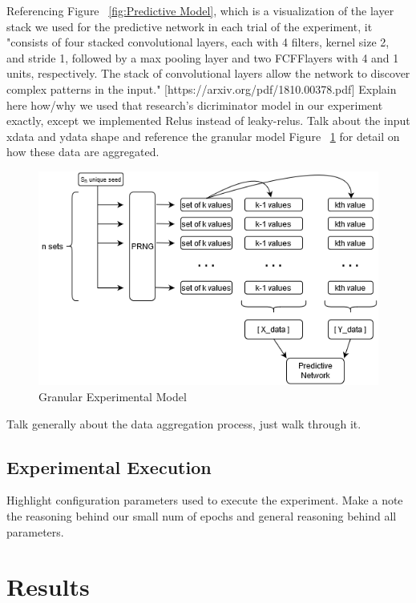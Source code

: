 \documentclass[conference]{IEEEtran}
\begin{document}
Referencing Figure ~\ref{fig:Predictive Model}, which is a visualization of the layer stack we used for the predictive network in each trial of the experiment, it "consists of four stacked convolutional layers, each with 4 filters, kernel size 2, and stride 1, followed by a max pooling layer and two FCFFlayers with 4 and 1 units, respectively. The stack of convolutional layers allow the network to discover complex patterns in the input." [https://arxiv.org/pdf/1810.00378.pdf] Explain here how/why we used that research's dicriminator model in our experiment exactly, except we implemented Relus instead of leaky-relus. Talk about the input xdata and ydata shape and reference the granular model Figure ~\ref{fig:Granular Experimental Model} for detail on how these data are aggregated.



\begin{figure}[H]
\centering
\includegraphics[width=1\linewidth]{./Images/GranularModel.png}
\caption{Granular Experimental Model}
\label{fig:Granular Experimental Model}
\end{figure}

Talk generally about the data aggregation process, just walk through it.

\subsection{Experimental Execution}
Highlight configuration parameters used to execute the experiment.
Make a note the reasoning behind our small num of epochs and general reasoning behind all parameters. 


\section{Results}
\end{document}
